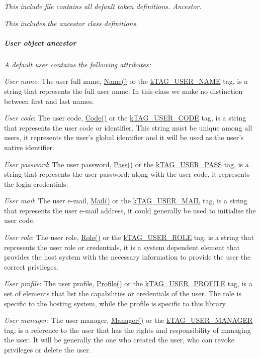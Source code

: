 {\itshape This include file contains all default token definitions. Ancestor.}

{\itshape This includes the ancestor class definitions. \subparagraph*{User object ancestor}}

{\itshape }

{\itshape A default user contains the following attributes\-:}

{\itshape 
\begin{DoxyItemize}
\item {\itshape User name}\-: The user full name, {\ttfamily \hyperlink{}{Name()}} or the {\ttfamily \hyperlink{}{k\-T\-A\-G\-\_\-\-U\-S\-E\-R\-\_\-\-N\-A\-M\-E}} tag, is a string that represents the full user name. In this class we make no distinction between first and last names. 
\item {\itshape User code}\-: The user code, {\ttfamily \hyperlink{}{Code()}} or the {\ttfamily \hyperlink{}{k\-T\-A\-G\-\_\-\-U\-S\-E\-R\-\_\-\-C\-O\-D\-E}} tag, is a string that represents the user code or identifier. This string must be unique among all users, it represents the user's global identifier and it will be used as the user's native identifier. 
\item {\itshape User password}\-: The user password, {\ttfamily \hyperlink{}{Pass()}} or the {\ttfamily \hyperlink{}{k\-T\-A\-G\-\_\-\-U\-S\-E\-R\-\_\-\-P\-A\-S\-S}} tag, is a string that represents the user password\-: along with the user code, it represents the login credentials. 
\item {\itshape User mail}\-: The user e-\/mail, {\ttfamily \hyperlink{}{Mail()}} or the {\ttfamily \hyperlink{}{k\-T\-A\-G\-\_\-\-U\-S\-E\-R\-\_\-\-M\-A\-I\-L}} tag, is a string that represents the user e-\/mail address, it could generally be used to initialise the user code. 
\item {\itshape User role}\-: The user role, {\ttfamily \hyperlink{}{Role()}} or the {\ttfamily \hyperlink{}{k\-T\-A\-G\-\_\-\-U\-S\-E\-R\-\_\-\-R\-O\-L\-E}} tag, is a string that represents the user role or credentials, it is a system dependent element that provides the host system with the necessary information to provide the user the correct privileges. 
\item {\itshape User profile}\-: The user profile, {\ttfamily \hyperlink{}{Profile()}} or the {\ttfamily \hyperlink{}{k\-T\-A\-G\-\_\-\-U\-S\-E\-R\-\_\-\-P\-R\-O\-F\-I\-L\-E}} tag, is a set of elements that list the capabilities or credentials of the user. The role is specific to the hosting system, while the profile is specific to this library. 
\item {\itshape User manager}\-: The user manager, {\ttfamily \hyperlink{}{Manager()}} or the {\ttfamily \hyperlink{}{k\-T\-A\-G\-\_\-\-U\-S\-E\-R\-\_\-\-M\-A\-N\-A\-G\-E\-R}} tag, is a reference to the user that has the rights and responsibility of managing the user. It will be generally the one who created the user, who can revoke privileges or delete the user. 
\end{DoxyItemize}}

